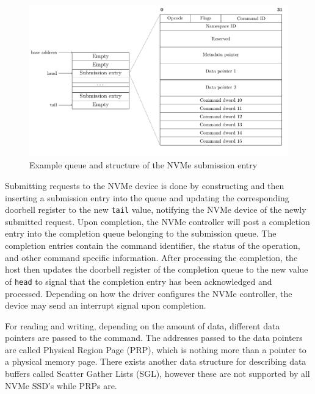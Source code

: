 \begin{figure}[]
  \centering
    \includegraphics[width=\textwidth]{figures/nvme-queue}
    \caption{Example queue and structure of the NVMe submission entry}
    \label{fig:nvme-queue}
\end{figure}

Submitting requests to the NVMe device is done by constructing and then inserting a submission entry into the queue and updating the corresponding doorbell register to the new \texttt{tail} value, notifying the NVMe device of the newly submitted request. Upon completion, the NVMe controller will post a completion entry into the completion queue belonging to the submission queue. The completion entries contain the command identifier, the status of the operation, and other command specific information. After processing the completion, the host then updates the doorbell register of the completion queue to the new value of \texttt{head} to signal that the completion entry has been acknowledged and processed. Depending on how the driver configures the NVMe controller, the device may send an interrupt signal upon completion.

For reading and writing, depending on the amount of data, different data pointers are passed to the command. The addresses passed to the data pointers are called Physical Region Page (PRP), which is nothing more than a pointer to a physical memory page. There exists another data structure for describing data buffers called Scatter Gather Lists (SGL), however these are not supported by all NVMe SSD's while PRPs are.

